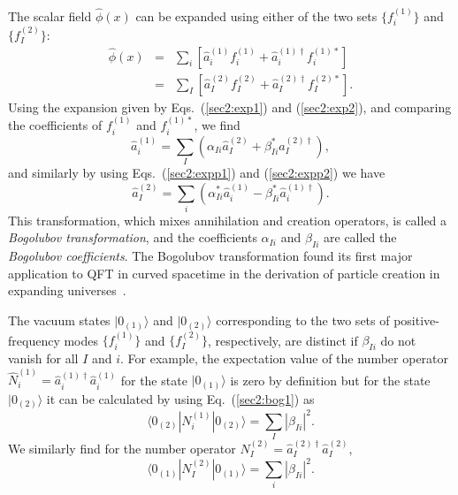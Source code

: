 \documentclass[12pt,nofootinbib,floatfix,aps,prd,showpacs,amsmath,amssymb,eqsecnum]{revtex4-2}
\begin{document}
The scalar field $\hat{\phi}(x)$ 
can be expanded using either of the two sets $\{f_i^{(1)}\}$ and 
$\{f_I^{(2)}\}$:
\begin{eqnarray}
\hat{\phi}(x) & = & 
\sum_i \left[ \hat{a}_i^{(1)}f_i^{(1)} + \hat{a}_i^{(1)\dagger}
f_i^{(1)*}\right] \nonumber \\
& = & \sum_I\left[ \hat{a}_I^{(2)}f_I^{(2)} + \hat{a}_I^{(2)\dagger}
f_I^{(2)*}\right].
\end{eqnarray}
Using the expansion given by Eqs.~(\ref{sec2:exp1}) and (\ref{sec2:exp2}),
and comparing the coefficients of $f_i^{(1)}$ and $f_i^{(1)*}$, we find
\begin{equation}
\hat{a}_i^{(1)} = \sum_I (\alpha_{Ii}\hat{a}_I^{(2)} 
+ \beta_{Ii}^* \hat{a}_I^{(2)\dagger}), \label{sec2:bog1}
\end{equation} 
and similarly by using 
Eqs.~(\ref{sec2:expp1}) and (\ref{sec2:expp2}) we have
\begin{equation}
\hat{a}_I^{(2)} = \sum_i (\alpha_{Ii}^*\hat{a}_i^{(1)} 
- \beta_{Ii}^* \hat{a}_i^{(1)\dagger}). \label{sec2:bog2}
\end{equation}
This transformation, which mixes annihilation and creation operators, 
is called a
{\em Bogolubov transformation}, 
and the coefficients $\alpha_{Ii}$ and $\beta_{Ii}$
are called the {\em Bogolubov coefficients}.  
The Bogolubov transformation found its
first major application to QFT in curved spacetime in
the derivation of particle creation in expanding
universes~\cite{Parker68,Sexletal69}. 

The vacuum states $|0_{(1)}\rangle$ and $|0_{(2)}\rangle$ 
corresponding to the two sets of positive-frequency modes 
$\{f_i^{(1)}\}$ and $\{f_I^{(2)}\}$, respectively, are distinct if 
$\beta_{Ii}$ do not vanish for all $I$ and $i$.  For example, the
expectation value of the number operator
$\hat{N}^{(1)}_i = \hat{a}_i^{(1)\dagger}\hat{a}_i^{(1)}$ for the state
$|0_{(1)}\rangle$ is zero by definition but for the state
$|0_{(2)}\rangle$ it can be calculated by using Eq.~(\ref{sec2:bog1}) as
\begin{equation}
\langle 0_{(2)}|N^{(1)}_i|0_{(2)}\rangle  = \sum_I |\beta_{Ii}|^2.
\end{equation}
We similarly find for the number operator 
$N^{(2)}_I = \hat{a}_I^{(2)\dagger}\hat{a}_I^{(2)}$,
\begin{equation}
\langle 0_{(1)}|N^{(2)}_I|0_{(1)}\rangle = \sum_i |\beta_{Ii}|^2.
\end{equation}
\end{document}
